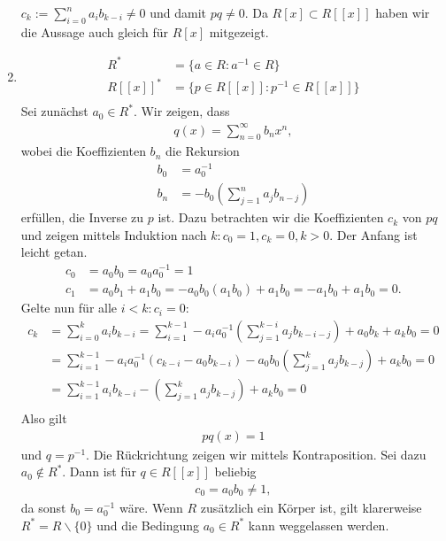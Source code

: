 \begin{solution}
\begin{enumerate}
  $c_k := \sum_{i=0}^n a_ib_{k-i} \neq 0$ und damit $pq \neq 0$.
  Da $R[x] \subset R[[x]]$ haben wir die Aussage auch gleich für $R[x]$
  mitgezeigt.
  \item \begin{align*}
    R^* &= \{a \in R: a^{-1} \in R\} \\
    R[[x]]^* &= \{p \in R[[x]]: p^{-1} \in R[[x]]\} \\
  \end{align*}
  Sei zunächst $a_0 \in R^*$. Wir zeigen, dass
  \begin{align*}
    q(x) = \sum_{n=0}^{\infty}b_nx^n,
  \end{align*}
  wobei die Koeffizienten $b_n$ die Rekursion
  \begin{align*}
    b_0 &= a_0^{-1} \\
    b_n &= -b_0\left(\sum_{j=1}^na_jb_{n-j}\right)
  \end{align*}
  erfüllen, die Inverse zu $p$ ist. Dazu betrachten wir die Koeffizienten $c_k$
  von $pq$ und zeigen mittels Induktion nach $k: c_0 = 1, c_k = 0, k > 0$. Der Anfang ist leicht getan.
  \begin{align*}
    c_0 &= a_0b_0 = a_0a_0^{-1} = 1 \\
    c_1 &= a_0b_1 + a_1b_0 = -a_0b_0(a_1b_0) + a_1b_0 = -a_1b_0 + a_1b_0 = 0.
  \end{align*}
  Gelte nun für alle $i < k: c_i = 0$:
  \begin{align*}
    c_k &= \sum_{i=0}^{k} a_i b_{k-i}
    = \sum_{i=1}^{k-1} -a_ia_0^{-1}\left(\sum_{j=1}^{k-i}a_jb_{k-i-j}\right) + a_0b_k + a_kb_0 = 0 \\
    &= \sum_{i=1}^{k-1} -a_ia_0^{-1}\left(c_{k-i} - a_0b_{k-i}\right) - a_0b_0\left(\sum_{j=1}^ka_jb_{k-j}\right) + a_kb_0 = 0 \\
    &= \sum_{i=1}^{k-1} a_ib_{k-i} - \left(\sum_{j=1}^ka_jb_{k-j}\right) + a_kb_0 = 0 \\
  \end{align*}
  Also gilt
  \begin{align*}
    pq(x) = 1
  \end{align*}
  und $q = p^{-1}$. Die Rückrichtung zeigen wir mittels Kontraposition. Sei dazu $a_0 \notin R^*$.
  Dann ist für $q \in R[[x]]$ beliebig
  \begin{align*}
    c_0  = a_0b_0 \neq 1,
  \end{align*}
  da sonst $b_0 = a_0^{-1}$ wäre.
  Wenn $R$ zusätzlich ein Körper ist, gilt klarerweise $R^* = R\backslash \{0\}$
  und die Bedingung $a_0 \in R^*$ kann weggelassen werden.

\end{enumerate}
\end{solution}

